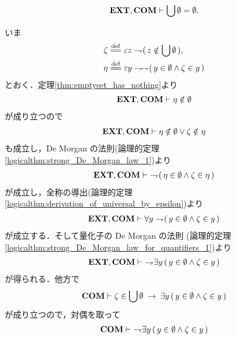 	\begin{screen}
		\begin{thm}[空集合の合併は空]\label{thm:the_union_of_the_emptyset_is_empty}
			\begin{align}
				\mbox{{\bf EXT}},\mbox{\bf COM} \vdash \bigcup \emptyset = \emptyset.
			\end{align}
		\end{thm}
	\end{screen}
	
	\begin{sketch}
		いま
		\begin{align}
			\zeta &\defeq \varepsilon z \negation (\, z \notin \bigcup \emptyset\, ), \\
			\eta &\defeq \varepsilon y \negation \negation (\, y \in \emptyset \wedge \zeta \in y\, )
		\end{align}
		とおく．定理\ref{thm:emptyset_has_nothing}より
		\begin{align}
			\mbox{{\bf EXT}},\mbox{\bf COM} \vdash \eta \notin \emptyset
		\end{align}
		が成り立つので
		\begin{align}
			\mbox{{\bf EXT}},\mbox{\bf COM} \vdash \eta \notin \emptyset \vee \zeta \notin \eta
		\end{align}
		も成立し，De Morgan の法則(論理的定理\ref{logicalthm:strong_De_Morgan_law_1})より
		\begin{align}
			\mbox{{\bf EXT}},\mbox{\bf COM} \vdash\ \rightharpoondown\hspace{-0.25em} (\, \eta \in \emptyset \wedge \zeta \in \eta\, )
		\end{align}
		が成立し，全称の導出(論理的定理\ref{logicalthm:derivation_of_universal_by_epsilon})より
		\begin{align}
			\mbox{{\bf EXT}},\mbox{\bf COM} \vdash \forall y \rightharpoondown\hspace{-0.25em} (\, y \in \emptyset \wedge \zeta \in y\, )
		\end{align}
		が成立する．そして量化子の De Morgan の法則
		(論理的定理\ref{logicalthm:strong_De_Morgan_law_for_quantifiers_1})より
		\begin{align}
			\mbox{{\bf EXT}},\mbox{\bf COM} \vdash\ \rightharpoondown\hspace{-0.25em} \exists y\, (\, y \in \emptyset \wedge \zeta \in y\, )
			\label{fom:the_union_of_the_emptyset_is_empty_1}
		\end{align}
		が得られる．他方で
		\begin{align}
			\mbox{\bf COM} \vdash \zeta \in \bigcup \emptyset
			\hspace{0.25em}\rightarrow\hspace{0.25em} \exists y\, (\, y \in \emptyset \wedge \zeta \in y\, )
		\end{align}
		が成り立つので，対偶を取って
		\begin{align}
			\COMAX \vdash\ 
			\negation \exists y\, (\, y \in \emptyset \wedge \zeta \in y\, )

\end{align}
\end{sketch}
